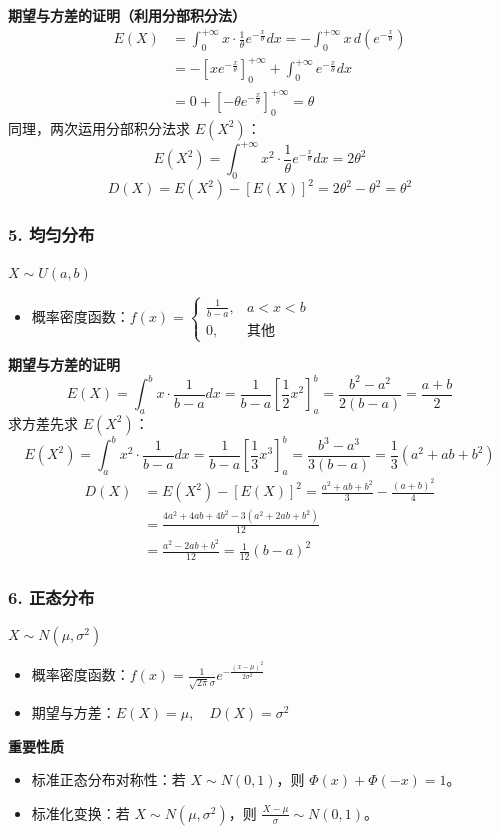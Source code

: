 \textbf{期望与方差的证明（利用分部积分法）}\quad
$$ 
\begin{aligned}
E(X) &= \int_{0}^{+\infty} x \cdot \frac{1}{\theta} e^{-\frac{x}{\theta}} dx = -\int_{0}^{+\infty} x \, d(e^{-\frac{x}{\theta}}) \\
&= -\left[ x e^{-\frac{x}{\theta}} \right]_{0}^{+\infty} + \int_{0}^{+\infty} e^{-\frac{x}{\theta}} dx \\
&= 0 + \left[ -\theta e^{-\frac{x}{\theta}} \right]_{0}^{+\infty} = \theta
\end{aligned}
$$
同理，两次运用分部积分法求 $E(X^2)$：
$$ E(X^2) = \int_{0}^{+\infty} x^2 \cdot \frac{1}{\theta} e^{-\frac{x}{\theta}} dx = 2\theta^2 $$
$$ D(X) = E(X^2) - [E(X)]^2 = 2\theta^2 - \theta^2 = \theta^2 $$


\vspace{1em}
\subsubsection*{5. 均匀分布}
$X \sim U(a,b)$
\begin{itemize}
    \item 概率密度函数：$f(x) = \begin{cases} \frac{1}{b-a}, & a < x < b \\ 0, & \text{其他} \end{cases}$
\end{itemize}

\textbf{期望与方差的证明}\quad 
$$ E(X) = \int_{a}^{b} x \cdot \frac{1}{b-a} dx = \frac{1}{b-a} \left[ \frac{1}{2}x^2 \right]_{a}^{b} = \frac{b^2 - a^2}{2(b-a)} = \frac{a+b}{2} $$
求方差先求 $E(X^2)$：
$$ E(X^2) = \int_{a}^{b} x^2 \cdot \frac{1}{b-a} dx = \frac{1}{b-a} \left[ \frac{1}{3}x^3 \right]_{a}^{b} = \frac{b^3 - a^3}{3(b-a)} = \frac{1}{3}(a^2 + ab + b^2) $$
$$ 
\begin{aligned}
D(X) &= E(X^2) - [E(X)]^2 = \frac{a^2 + ab + b^2}{3} - \frac{(a+b)^2}{4} \\
&= \frac{4a^2 + 4ab + 4b^2 - 3(a^2 + 2ab + b^2)}{12} \\
&= \frac{a^2 - 2ab + b^2}{12} = \frac{1}{12}(b-a)^2
\end{aligned}
$$


\vspace{1em}
\subsubsection*{6. 正态分布}
$X \sim N(\mu, \sigma^2)$
\begin{itemize}
    \item 概率密度函数：$f(x) = \frac{1}{\sqrt{2\pi}\sigma} e^{-\frac{(x-\mu)^2}{2\sigma^2}}$
    \item 期望与方差：$E(X) = \mu, \quad D(X) = \sigma^2$
\end{itemize}

\textbf{重要性质}
\begin{itemize}
    \item 标准正态分布对称性：若 $X \sim N(0,1)$，则 $\Phi(x) + \Phi(-x) = 1$。
    \item 标准化变换：若 $X \sim N(\mu, \sigma^2)$，则 $\frac{X-\mu}{\sigma} \sim N(0,1)$。
\end{itemize}